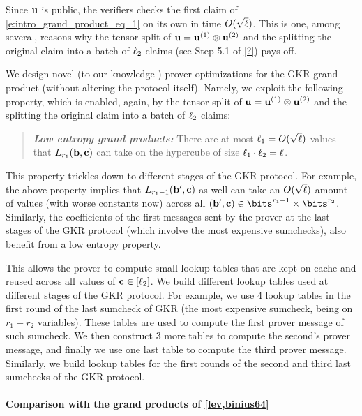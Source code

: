 \documentclass[11pt,letterpaper,usenames,dvipsnames]{article}
\begin{document}
    Since $\mathbf{u}$ is public, the verifiers checks the first claim of \eqref{e:intro_grand_product_eq_1} on its own in time $O(\sqrt{\ell})$. This is one, among several, reasons why the tensor split of $\mathbf{u}=\mathbf{u}^{(1)} \otimes \mathbf{u}^{(2)}$ and the splitting the original claim into a batch of $\ell_2$ claims (see Step 5.1 of \cref{?}) pays off. 


    
    We design novel (to our knowledge ) prover optimizations for the GKR grand product (without altering the protocol itself). Namely, we exploit the following property, which is enabled, again, by the tensor split of $\mathbf{u}=\mathbf{u}^{(1)} \otimes \mathbf{u}^{(2)}$ and the splitting the original claim into a batch of $\ell_2$ claims:
    \medskip

    \begin{quote}\emph{\textbf{Low entropy grand products:}} There are at most $\ell_1=O(\sqrt{\ell})$ values that $L_{r_1}(\mathbf{b},\mathbf{c})$ can take on the hypercube of size $\ell_1\cdot \ell_2 = \ell$. \end{quote}

     

    This property trickles down to different stages of the GKR protocol. For example, the above property implies that $L_{r_1-1}(\mathbf{b}',\mathbf{c})$ as well can take an $O(\sqrt{\ell})$ amount of values (with worse constants now) across all $(\bb',\cc)\in \bits^{r_1-1}\times \bits^{r_2}$. Similarly, the coefficients of the first messages sent by the prover at the last stages of the GKR protocol (which involve the most expensive sumchecks), also benefit from a low entropy property. 

    This allows the  prover to compute small lookup tables that are kept on cache and reused across all values of $\mathbf{c}\in [\ell_2]$. We build different lookup tables used at different stages of the GKR protocol.  For example, we use 4 lookup tables in the first round of the last sumcheck of GKR (the most expensive sumcheck, being on $r_1+r_2$ variables). These tables are used to compute the first prover message of such sumcheck. We then construct 3 more tables to compute the second's prover message, and finally we use one last table to compute the third prover message. Similarly, we build lookup tables for the first rounds of the second and third last sumchecks of the GKR protocol.


    \paragraph{Comparison with the grand products of \cref{lev,binius64}}
\end{document}
